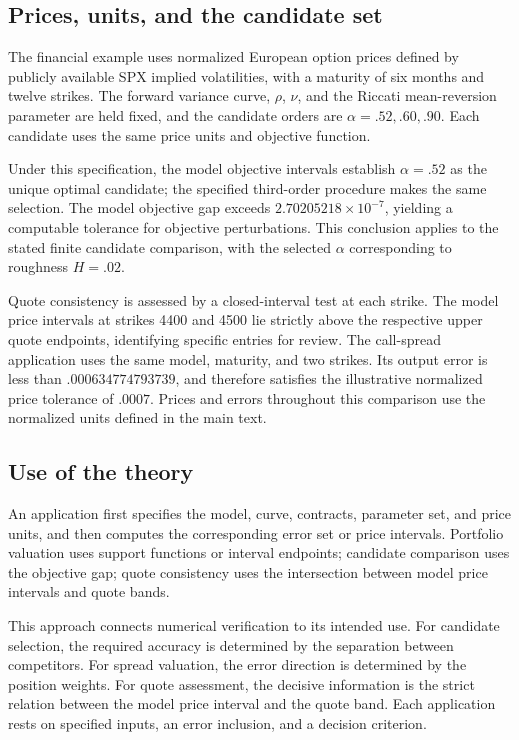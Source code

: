 \documentclass[a4paper,11pt]{article}
\begin{document}
\subsection*{Prices, units, and the candidate set}

The financial example uses normalized European option prices defined by publicly available SPX implied volatilities, with a maturity of six months and twelve strikes. The forward variance curve, \(\rho\), \(\nu\), and the Riccati mean-reversion parameter are held fixed, and the candidate orders are \(\alpha=.52,.60,.90\). Each candidate uses the same price units and objective function.

Under this specification, the model objective intervals establish \(\alpha=.52\) as the unique optimal candidate; the specified third-order procedure makes the same selection. The model objective gap exceeds \(2.70205218\times10^{-7}\), yielding a computable tolerance for objective perturbations. This conclusion applies to the stated finite candidate comparison, with the selected \(\alpha\) corresponding to roughness \(H=.02\).

Quote consistency is assessed by a closed-interval test at each strike. The model price intervals at strikes 4400 and 4500 lie strictly above the respective upper quote endpoints, identifying specific entries for review. The call-spread application uses the same model, maturity, and two strikes. Its output error is less than \(.000634774793739\), and therefore satisfies the illustrative normalized price tolerance of \(.0007\). Prices and errors throughout this comparison use the normalized units defined in the main text.

\subsection*{Use of the theory}

An application first specifies the model, curve, contracts, parameter set, and price units, and then computes the corresponding error set or price intervals. Portfolio valuation uses support functions or interval endpoints; candidate comparison uses the objective gap; quote consistency uses the intersection between model price intervals and quote bands.

This approach connects numerical verification to its intended use. For candidate selection, the required accuracy is determined by the separation between competitors. For spread valuation, the error direction is determined by the position weights. For quote assessment, the decisive information is the strict relation between the model price interval and the quote band. Each application rests on specified inputs, an error inclusion, and a decision criterion.
\end{document}
